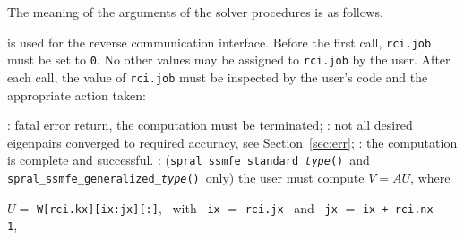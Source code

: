 \medskip
The meaning of the arguments of the solver procedures is as follows.

\begin{description}
%
 is used for the reverse communication interface.
Before the first call, {\tt rci.job} must be set to {\tt 0}.
No other values may be assigned to {\tt rci.job} by the user.
After each call,
the value of {\tt rci.job} must be inspected by the user's code
and the appropriate action taken: 
\begin{description}
%
: fatal error return, the computation must be terminated;
%
: 
not all desired eigenpairs converged to required accuracy,
see Section~\ref{sec:err}; 
%
: the computation is complete and successful.
%
:
({\tt spral\_ssmfe\_standard\_\textit{type}()}\ and {\tt spral\_ssmfe\_generalized\_\textit{type}()}\ only)
the user must compute $V = A U$, where

\hspace{8mm}
$U=$ {\tt W[rci.kx][ix:jx][:]}, 
~with~ {\tt ix} $=$ {\tt rci.jx} 
~and~
{\tt jx} $=$ {\tt ix + rci.nx - 1},


\end{description}
\end{description}
